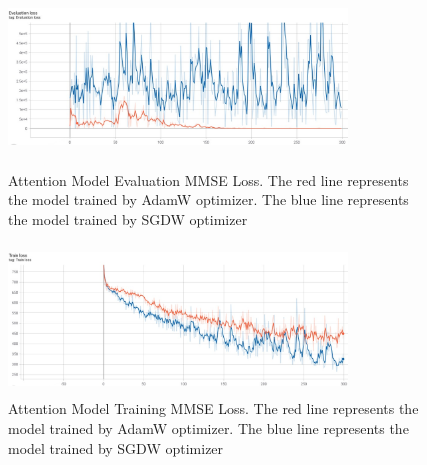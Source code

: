 \documentclass[final]{cvpr}
\begin{document}
\begin{figure}[htbp]
\centering
\begin{minipage}[t]{0.48\textwidth}
\centering
\includegraphics[width=9cm,height=4cm]{Attention Eval.jpg}
\caption{Attention Model Evaluation MMSE Loss. The red line represents the model trained by AdamW optimizer. The blue line represents the model trained by SGDW optimizer}
\end{minipage}
\begin{minipage}[t]{0.48\textwidth}
\centering
\includegraphics[width=9cm,height=4cm]{Attention train.jpg}
\caption{Attention Model Training MMSE Loss. The red line represents the model trained by AdamW optimizer. The blue line represents the model trained by SGDW optimizer}
\end{minipage}
\end{figure}
\end{document}
